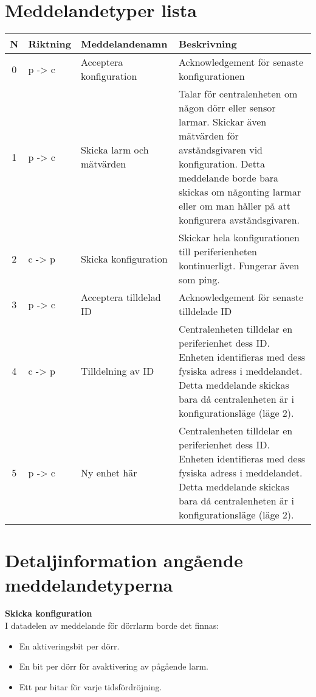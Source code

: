 \documentclass[a4paper]{article}
\begin{document}
\section*{Meddelandetyper lista}
\label{sec:meddelandetyper}

\begin{table}[H]
	\begin{tabular}{|c|l|p{2.6cm}|p{6cm}|}
		\hline
		N& Riktning & Meddelandenamn & Beskrivning \\ \hline \hline
		0 & p -> c & Acceptera konfiguration & Acknowledgement för senaste konfigurationen \\ \hline
		1 & p -> c & Skicka larm och mätvärden & Talar för centralenheten om någon dörr eller sensor larmar. Skickar även mätvärden för avståndsgivaren vid konfiguration. Detta meddelande borde bara skickas om någonting larmar eller om man håller på att konfigurera avståndsgivaren. \\ \hline
		2 & c -> p & Skicka konfiguration & Skickar hela konfigurationen till periferienheten kontinuerligt. Fungerar även som ping. \\ \hline
		3 & p -> c & Acceptera  tilldelad ID & Acknowledgement för senaste tilldelade ID \\ \hline
		4 & c -> p & Tilldelning av ID & Centralenheten tilldelar en periferienhet dess ID. Enheten identifieras med dess fysiska adress i meddelandet. Detta meddelande skickas bara då centralenheten är i konfigurationsläge (läge  2). \\ \hline
		5 & p -> c & Ny enhet här & Centralenheten tilldelar en periferienhet dess ID. Enheten identifieras med dess fysiska adress i meddelandet. Detta meddelande skickas bara då centralenheten är i konfigurationsläge (läge  2). \\ \hline
	\end{tabular}
	\label{tab:meddelandetyper}
\end{table}

\section*{Detaljinformation angående meddelandetyperna}
\label{sec:detaljinfo}
\textbf{Skicka konfiguration} \\
I datadelen av meddelande för dörrlarm borde det finnas:
\begin{itemize}
	\item En aktiveringsbit per dörr.
	\item En bit per dörr för avaktivering av pågående larm.
	\item Ett par bitar för varje tidsfördröjning.
\end{itemize}
\end{document}
